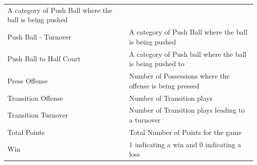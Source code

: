 \documentclass[]{book}
\begin{document}
\begin{longtable}[]{@{}ll@{}}
\begin{minipage}[t]{0.62\columnwidth}
A category of Push Ball where the ball is being pushed\strut
\end{minipage}\tabularnewline
\begin{minipage}[t]{0.32\columnwidth}\raggedright
Push Ball - Turnover\strut
\end{minipage} & \begin{minipage}[t]{0.62\columnwidth}\raggedright
A category of Push Ball where the ball is being pushed\strut
\end{minipage}\tabularnewline
\begin{minipage}[t]{0.32\columnwidth}\raggedright
Push Ball to Half Court\strut
\end{minipage} & \begin{minipage}[t]{0.62\columnwidth}\raggedright
A category of Push ball where the ball is being pushed to\strut
\end{minipage}\tabularnewline
\begin{minipage}[t]{0.32\columnwidth}\raggedright
Press Offense\strut
\end{minipage} & \begin{minipage}[t]{0.62\columnwidth}\raggedright
Number of Possessions where the offense is being pressed\strut
\end{minipage}\tabularnewline
\begin{minipage}[t]{0.32\columnwidth}\raggedright
Transition Offense\strut
\end{minipage} & \begin{minipage}[t]{0.62\columnwidth}\raggedright
Number of Transition plays\strut
\end{minipage}\tabularnewline
\begin{minipage}[t]{0.32\columnwidth}\raggedright
Transition Turnover\strut
\end{minipage} & \begin{minipage}[t]{0.62\columnwidth}\raggedright
Number of Transition plays leading to a turnover\strut
\end{minipage}\tabularnewline
\begin{minipage}[t]{0.32\columnwidth}\raggedright
Total Points\strut
\end{minipage} & \begin{minipage}[t]{0.62\columnwidth}\raggedright
Total Number of Points for the game\strut
\end{minipage}\tabularnewline
\begin{minipage}[t]{0.32\columnwidth}\raggedright
Win\strut
\end{minipage} & \begin{minipage}[t]{0.62\columnwidth}\raggedright
1 indicating a win and 0 indicating a loss\strut
\end{minipage}\tabularnewline
\bottomrule
\end{longtable}
\end{document}
